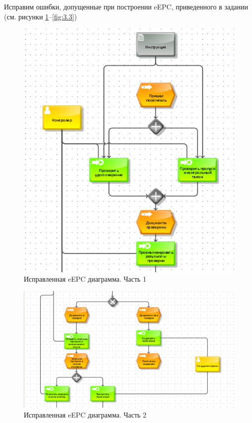 \documentclass[a4paper,14pt]{extarticle}
\begin{document}
\newpage

\begin{problem*}
	Исправим ошибки, допущенные при построении
	eEPC, приведенного в задании (см. рисунки \ref{fig:3.1}--\ref{fig:3.3})
	
	
	\begin{figure}[h!]
		\centering
		\includegraphics[width=0.7\linewidth]{images/pr-20/3.1}
		\caption{Исправленная eEPC диаграмма.
 Часть 1}
		\label{fig:3.1}
	\end{figure}
	
	\begin{figure}[h!]
		\centering
		\includegraphics[width=0.7\linewidth]{images/pr-20/3.2}
		\caption{Исправленная eEPC диаграмма.
 Часть 2}
		\label{fig:3.2}
	\end{figure}
	

\end{problem*}
\end{document}
